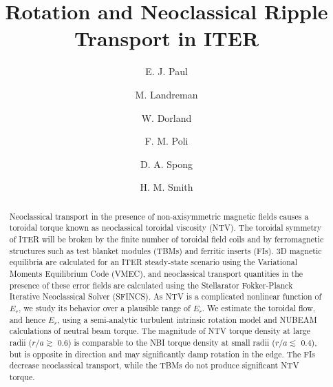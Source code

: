 \documentclass[aip, pop, preprint]{revtex4-1}
\numberwithin{figure}{section}
\numberwithin{equation}{section}
\begin{document}
\title{Rotation and Neoclassical Ripple Transport in ITER}
\author{E. J. Paul}

\author{M. Landreman}

\author{W. Dorland}

\author{F. M. Poli}

\author{D. A. Spong}

\author{H. M. Smith}

\begin{abstract}

Neoclassical transport in the presence of non-axisymmetric magnetic fields causes a toroidal torque known as neoclassical toroidal viscosity (NTV). The toroidal symmetry of ITER will be broken by the finite number of toroidal field coils and by ferromagnetic structures such as test blanket modules (TBMs) and ferritic inserts (FIs). 3D magnetic equilibria are calculated for an ITER steady-state scenario using the Variational Moments Equilibrium Code (VMEC), and neoclassical transport quantities in the presence of these error fields are calculated using the Stellarator Fokker-Planck Iterative Neoclassical Solver (SFINCS). As NTV is a complicated nonlinear function of $E_r$, we study its behavior over a plausible range of $E_r$. We estimate the toroidal flow, and hence $E_r$, using a semi-analytic turbulent intrinsic rotation model and NUBEAM calculations of neutral beam torque. The magnitude of NTV torque density at large radii ($r/a \gtrsim$ 0.6) is comparable to the NBI torque density at small radii ($r/a \lesssim$ 0.4), but is opposite in direction and may significantly damp rotation in the edge. The FIs decrease neoclassical transport, while the TBMs do not produce significant NTV torque. 
\end{abstract}

\maketitle
\end{document}
